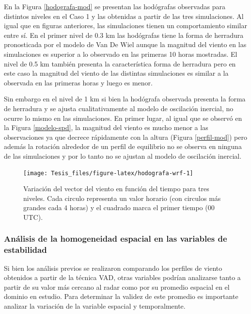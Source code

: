 \documentclass[12pt,spanish,oneside, a4paper]{book}
\begin{document}
En la Figura \ref{hodografa-mod} se presentan las hodógrafas observadas
para distintos niveles en el Caso 1 y las obtenidas a partir de las tres
simulaciones. Al igual que en figuras anteriores, las simulaciones
tienen un comportamiento similar entre sí. En el primer nivel de 0.3 km
las hodógrafas tiene la forma de herradura pronosticada por el modelo de
Van De Wiel aunque la magnitud del viento en las simulaciones es
superior a lo observado en las primeras 10 horas mostradas. El nivel de
0.5 km también presenta la característica forma de herradura pero en
este caso la magnitud del viento de las distintas simulaciones es
similar a la observada en las primeras horas y luego es menor.

Sin embargo en el nivel de 1 km si bien la hodógrafa observada presenta
la forma de herradura y se ajusta cualitativamente al modelo de
oscilación inercial, no ocurre lo mismo en las simulaciones. En primer
lugar, al igual que se observó en la Figura \ref{modelo-spd}, la
magnitud del viento es mucho menor a las observaciones ya que decrece
rápidamente con la altura (Figura \ref{perfil-mod}) pero además la
rotación alrededor de un perfil de equilibrio no se observa en ninguna
de las simulaciones y por lo tanto no se ajustan al modelo de oscilación
inercial.

\begin{figure}

{\centering \texttt{[image: Tesis\_files/figure-latex/hodografa-wrf-1]} 

}

\caption{Variación del vector del viento en función del tiempo para tres niveles. Cada circulo representa un valor horario (con circulos más grandes cada 4 horas) y el cuadrado marca el primer tiempo (00 UTC). \label{hodografa-mod}}\label{fig:hodografa-wrf}
\end{figure}

\subsubsection{Análisis de la homogeneidad espacial en las variables de
estabilidad}\label{analisis-de-la-homogeneidad-espacial-en-las-variables-de-estabilidad}

Si bien los análisis previos se realizaron comparando los perfiles de
viento obtenidos a partir de la técnica VAD, otras variables podrían
analizarse tanto a partir de su valor más cercano al radar como por su
promedio espacial en el dominio en estudio. Para determinar la validez
de este promedio es importante analizar la variación de la variable
espacial y temporalmente.
\end{document}
